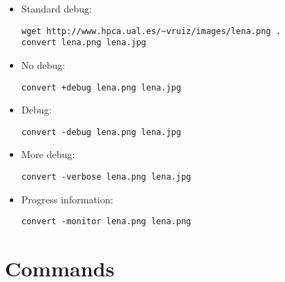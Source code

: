 \begin{itemize}
\item Standard debug:
\begin{lstlisting}
wget http://www.hpca.ual.es/~vruiz/images/lena.png .
convert lena.png lena.jpg
\end{lstlisting}
\item No debug:
\begin{lstlisting}
convert +debug lena.png lena.jpg
\end{lstlisting}
\item Debug:
\begin{lstlisting}
convert -debug lena.png lena.jpg
\end{lstlisting}
\item More debug:
\begin{lstlisting}
convert -verbose lena.png lena.jpg
\end{lstlisting}
\item Progress information:
\begin{lstlisting}
convert -monitor lena.png lena.png
\end{lstlisting}

\end{itemize}


\section{Commands}

